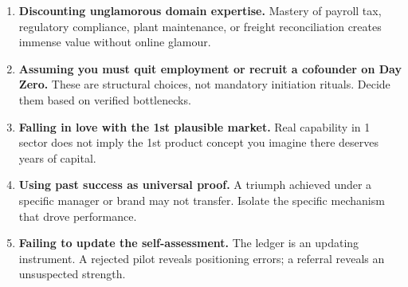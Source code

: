 \begin{enumerate}[label=\textbf{\arabic*.},leftmargin=11pt,itemsep=2pt,topsep=1.5pt,parsep=0pt]
  \item \textbf{Discounting unglamorous domain expertise.} Mastery of payroll tax, regulatory compliance, plant maintenance, or freight reconciliation creates immense value without online glamour.
  \item \textbf{Assuming you must quit employment or recruit a cofounder on Day Zero.} These are structural choices, not mandatory initiation rituals. Decide them based on verified bottlenecks.
  \item \textbf{Falling in love with the 1st plausible market.} Real capability in 1 sector does not imply the 1st product concept you imagine there deserves years of capital.
  \item \textbf{Using past success as universal proof.} A triumph achieved under a specific manager or brand may not transfer. Isolate the specific mechanism that drove performance.
  \item \textbf{Failing to update the self-assessment.} The ledger is an updating instrument. A rejected pilot reveals positioning errors; a referral reveals an unsuspected strength.
\end{enumerate}

